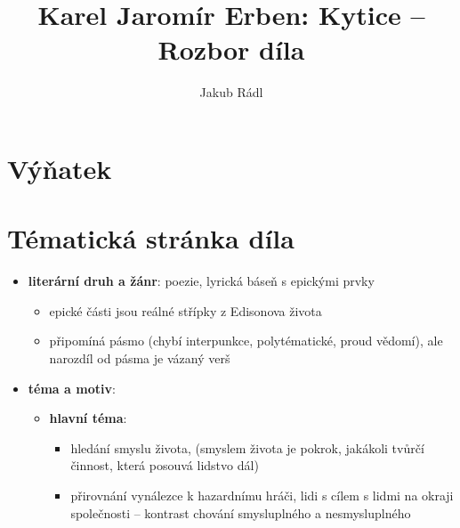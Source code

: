 \documentclass[10pt,a4paper]{article}
\date{}
\author{Jakub Rádl}
\title{Karel Jaromír Erben: Kytice -- Rozbor díla}
\begin{document}
\maketitle

\section*{Výňatek}


\section*{Tématická stránka díla}
\begin{itemize}
\item \textbf{literární druh a žánr}: poezie, lyrická báseň s epickými prvky
	\begin{itemize}
	\item epické části jsou reálné střípky z Edisonova života
	\item připomíná pásmo (chybí interpunkce, polytématické, proud vědomí), ale narozdíl od pásma je vázaný verš
	\end{itemize}
\item \textbf{téma a motiv}:
	\begin{itemize}
	\item \textbf{hlavní téma}: 
		\begin{itemize}
		\item hledání smyslu života, (smyslem života je pokrok, jakákoli tvůrčí činnost, která posouvá lidstvo dál)
		\item přirovnání vynálezce k hazardnímu hráči, lidi s cílem s lidmi na okraji společnosti -- kontrast chování smysluplného a nesmysluplného
		
		\end{itemize}				
		

\end{itemize}
\end{itemize}
\end{document}

